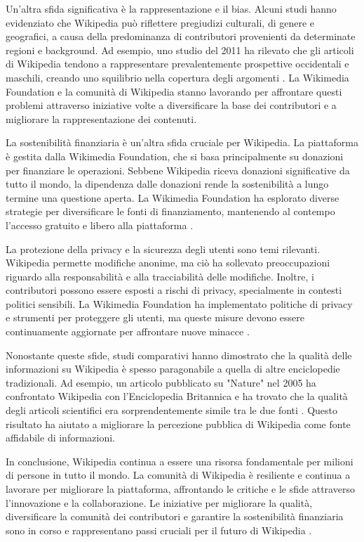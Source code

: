 \documentclass[12pt,a4paper]{report}
\begin{document}
Un'altra sfida significativa è la rappresentazione e il bias. Alcuni studi hanno evidenziato che Wikipedia può riflettere pregiudizi culturali, di genere e geografici, a causa della predominanza di contributori provenienti da determinate regioni e background. Ad esempio, uno studio del 2011 ha rilevato che gli articoli di Wikipedia tendono a rappresentare prevalentemente prospettive occidentali e maschili, creando uno squilibrio nella copertura degli argomenti \cite{lam2011wp}. La Wikimedia Foundation e la comunità di Wikipedia stanno lavorando per affrontare questi problemi attraverso iniziative volte a diversificare la base dei contributori e a migliorare la rappresentazione dei contenuti.

La sostenibilità finanziaria è un'altra sfida cruciale per Wikipedia. La piattaforma è gestita dalla Wikimedia Foundation, che si basa principalmente su donazioni per finanziare le operazioni. Sebbene Wikipedia riceva donazioni significative da tutto il mondo, la dipendenza dalle donazioni rende la sostenibilità a lungo termine una questione aperta. La Wikimedia Foundation ha esplorato diverse strategie per diversificare le fonti di finanziamento, mantenendo al contempo l'accesso gratuito e libero alla piattaforma \cite{history_of_wikis}.

La protezione della privacy e la sicurezza degli utenti sono temi rilevanti. Wikipedia permette modifiche anonime, ma ciò ha sollevato preoccupazioni riguardo alla responsabilità e alla tracciabilità delle modifiche. Inoltre, i contributori possono essere esposti a rischi di privacy, specialmente in contesti politici sensibili. La Wikimedia Foundation ha implementato politiche di privacy e strumenti per proteggere gli utenti, ma queste misure devono essere continuamente aggiornate per affrontare nuove minacce \cite{denning2005wikipedia}.

Nonostante queste sfide, studi comparativi hanno dimostrato che la qualità delle informazioni su Wikipedia è spesso paragonabile a quella di altre enciclopedie tradizionali. Ad esempio, un articolo pubblicato su "Nature" nel 2005 ha confrontato Wikipedia con l'Enciclopedia Britannica e ha trovato che la qualità degli articoli scientifici era sorprendentemente simile tra le due fonti \cite{giles2005nature}. Questo risultato ha aiutato a migliorare la percezione pubblica di Wikipedia come fonte affidabile di informazioni.

In conclusione, Wikipedia continua a essere una risorsa fondamentale per milioni di persone in tutto il mondo. La comunità di Wikipedia è resiliente e continua a lavorare per migliorare la piattaforma, affrontando le critiche e le sfide attraverso l'innovazione e la collaborazione. Le iniziative per migliorare la qualità, diversificare la comunità dei contributori e garantire la sostenibilità finanziaria sono in corso e rappresentano passi cruciali per il futuro di Wikipedia \cite{reagle2010good}.
\end{document}
